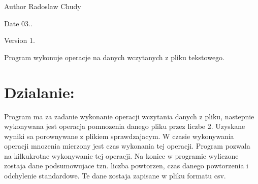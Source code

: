 \begin{DoxyAuthor}{Author}
Radoslaw Chudy 
\end{DoxyAuthor}
\begin{DoxyDate}{Date}
03.. 
\end{DoxyDate}
\begin{DoxyVersion}{Version}
1. \begin{DoxyVerb}Program wykonuje operacje na danych wczytanych z pliku tekstowego.
\end{DoxyVerb}

\end{DoxyVersion}
\hypertarget{index_etykieta-dzialanie}{}\section{Dzialanie\-:}\label{index_etykieta-dzialanie}
Program ma za zadanie wykonanie operacji wczytania danych z pliku, nastepnie wykonywana jest operacja pomnozenia danego pliku przez liczbe 2. Uzyskane wyniki sa porownywane z plikiem sprawdzajacym. W czasie wykonywania operacji mnozenia mierzony jest czas wykonania tej operacji. Program pozwala na kilkukrotne wykonywanie tej operacji. Na koniec w programie wyliczone zostaja dane podsumowujace tzn. liczba powtorzen, czas danego powtorzenia i odchylenie standardowe. Te dane zostaja zapisane w pliku formatu csv. 